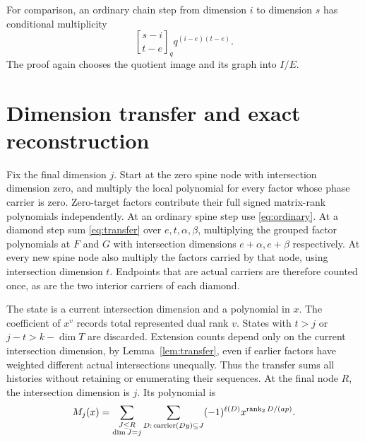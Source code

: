 \documentclass[11pt]{article}
\newcommand{\gb}[2]{{#1\brack #2}_q}
\begin{document}
For comparison, an ordinary chain step from dimension $i$ to dimension $s$
has conditional multiplicity
\begin{equation}\label{eq:ordinary}
 \gb{s-i}{t-e}q^{(i-e)(t-e)}.
\end{equation}
The proof again chooses the quotient image and its graph into $I/E$.

\section{Dimension transfer and exact reconstruction}
Fix the final dimension $j$. Start at the zero spine node with intersection
dimension zero, and multiply the local polynomial for every factor whose
phase carrier is zero. Zero-target factors contribute their full signed
matrix-rank polynomials independently. At an ordinary spine step use
\eqref{eq:ordinary}. At a diamond step sum \eqref{eq:transfer} over
$e,t,\alpha,\beta$, multiplying the grouped factor polynomials at $F$ and
$G$ with intersection dimensions $e+\alpha,e+\beta$ respectively.
At every new spine node also multiply the factors carried by that node,
using intersection dimension $t$. Endpoints that are actual carriers are
therefore counted once, as are the two interior carriers of each diamond.

The state is a current intersection dimension and a polynomial in $x$.
The coefficient of $x^v$ records total represented dual rank $v$. States
with $t>j$ or $j-t>k-\dim T$ are discarded. Extension counts depend only on
the current intersection dimension, by Lemma~\ref{lem:transfer}, even if
earlier factors have weighted different actual intersections unequally.
Thus the transfer sums all histories without retaining or enumerating
their sequences. At the final node $R$, the intersection dimension is $j$.
Its polynomial is
\[
 M_j(x)=\sum_{\substack{J\le R\\\dim J=j}}
       \sum_{D:\,\operatorname{carrier}(Dy)\subseteq J}
            (-1)^{\ell(D)}x^{\operatorname{rank}_2D/(ap)}.
\]
\end{document}

